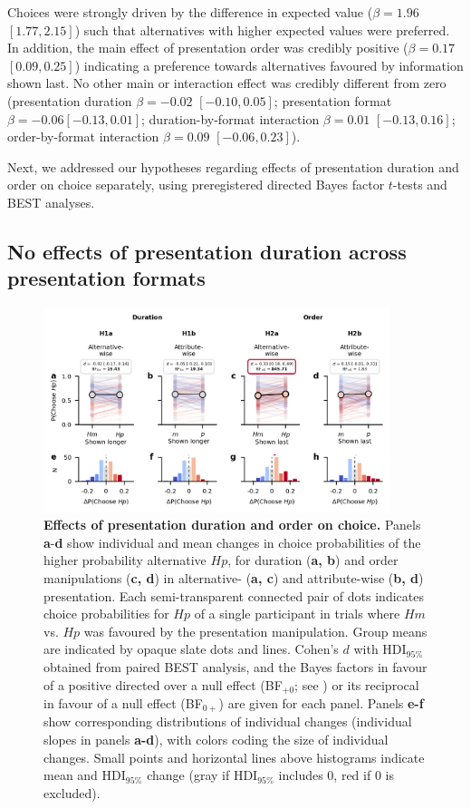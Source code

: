 \documentclass[11pt, a4paper, twocolumn, abstract]{scrartcl}
\begin{document}
Choices were strongly driven by the difference in expected value ($\beta = 1.96$ $[1.77, 2.15]$) such that alternatives with higher expected values were preferred. In addition, the main effect of presentation order was credibly positive ($\beta = 0.17$ $[0.09, 0.25]$) indicating a preference towards alternatives favoured by information shown last. No other main or interaction effect was credibly different from zero (presentation duration $\beta = -0.02$ $[-0.10, 0.05]$; presentation format $\beta = -0.06 [-0.13, 0.01]$; duration-by-format interaction $\beta = 0.01$ $[-0.13, 0.16]$; order-by-format interaction $\beta = 0.09$ $[-0.06, 0.23]$). 

Next, we addressed our hypotheses regarding effects of presentation duration and order on choice separately, using preregistered directed Bayes factor $t$-tests and BEST analyses.

\subsection*{No effects of presentation duration across presentation formats}

\begin{figure}[t]
    \centering
    \includegraphics[width=0.9\textwidth]{figures/choice_analyses_individual_changes.png}
    \caption{\textbf{Effects of presentation duration and order on choice.} Panels \textbf{a}-\textbf{d} show individual and mean changes in choice probabilities of the higher probability alternative $Hp$, for duration (\textbf{a, b}) and order manipulations (\textbf{c, d}) in alternative- (\textbf{a, c}) and attribute-wise (\textbf{b, d}) presentation. Each semi-transparent connected pair of dots indicates choice probabilities for $Hp$ of a single participant in trials where $Hm$ vs. $Hp$ was favoured by the presentation manipulation. Group means are indicated by opaque slate dots and lines. Cohen's $d$ with HDI$_{95\%}$ obtained from paired BEST analysis, and the Bayes factors in favour of a positive directed over a null effect (BF$_{+0}$; see ) or its reciprocal in favour of a null effect (BF$_{0+}$) are given for each panel. Panels \textbf{e-f} show corresponding distributions of individual changes (individual slopes in panels \textbf{a-d}), with colors coding the size of individual changes. Small points and horizontal lines above histograms indicate mean and HDI$_{95\%}$ change (gray if HDI$_{95\%}$ includes 0, red if 0 is excluded).}
    \label{fig:choiceprobabilitychanges}
\end{figure}
\end{document}
